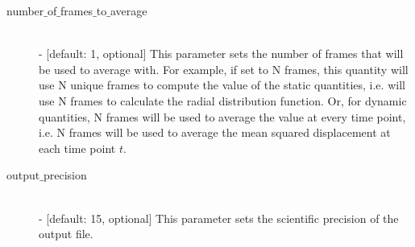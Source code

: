 \documentclass{article}
\begin{document}
\begin{description}
	\item[number$\_$of$\_$frames$\_$to$\_$average] \hfill \\
	- [default: 1, optional] This parameter sets the number of frames that will be used to average with.  For example, if set to N frames, this quantity will use N unique frames to compute the value of the static quantities, i.e. will use N frames to calculate the radial distribution function.  Or, for dynamic quantities, N frames will be used to average the value at every time point, i.e. N frames will be used to average the mean squared displacement at each time point $t$.
	
	\item[output$\_$precision] \hfill \\
	- [default: 15, optional] This parameter sets the scientific precision of the output file.
	
	
\end{description}
\end{document}
